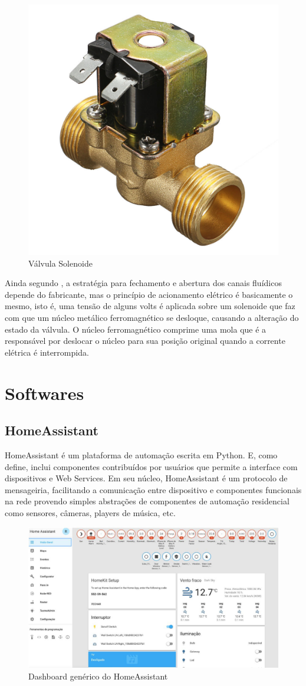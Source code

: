 \begin{figure}[htbp]
	\centering
	\includegraphics[width=0.3\linewidth]{figuras/valvula-solenoide.jpg}
	\caption{Válvula Solenoide}
	\label{valvula-solenoide}
\end{figure}

Ainda segundo \cite{da2002modulo}, a estratégia para fechamento e abertura dos canais fluídicos depende do fabricante, mas o princípio de acionamento elétrico é basicamente o mesmo, isto é, uma tensão de alguns volts é aplicada sobre um solenoide que faz com que um núcleo metálico ferromagnético se desloque, causando a alteração do estado da válvula. O núcleo
ferromagnético comprime uma mola que é a responsável por deslocar o núcleo para sua posição original quando a corrente elétrica é interrompida.

\section{Softwares}

\subsection{HomeAssistant}

HomeAssistant é um plataforma de automação escrita em Python. E, como \cite{Lundrigan2017} define, inclui componentes contribuídos por usuários que permite a interface com dispositivos e Web Services. Em seu núcleo, HomeAssistant é um protocolo de mensageiria, facilitando a comunicação entre dispositivo e componentes funcionais na rede provendo simples abstrações de componentes de automação residencial como sensores, câmeras, players de música, etc.

\begin{figure}[htbp]
	\centering
	\includegraphics[width=1\linewidth]{figuras/homeassistant-dash.png}
	\caption{Dashboard genérico do HomeAssistant}
	\label{fig:homeassistant-dash}
\end{figure}


